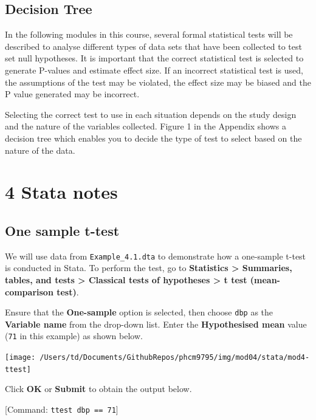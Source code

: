 \documentclass[
]{memoir}
\begin{document}
\hypertarget{decision-tree}{%
\section{Decision Tree}\label{decision-tree}}

In the following modules in this course, several formal statistical tests will be described to analyse different types of data sets that have been collected to test set null hypotheses. It is important that the correct statistical test is selected to generate P-values and estimate effect size. If an incorrect statistical test is used, the assumptions of the test may be violated, the effect size may be biased and the P value generated may be incorrect.

Selecting the correct test to use in each situation depends on the study design and the nature of the variables collected. Figure 1 in the Appendix shows a decision tree which enables you to decide the type of test to select based on the nature of the data.

\hypertarget{stata-notes}{%
\chapter*{\texorpdfstring{\textbf{4} Stata notes}{4 Stata notes}}\label{stata-notes}}

\hypertarget{one-sample-t-test-1}{%
\section{One sample t-test}\label{one-sample-t-test-1}}

We will use data from \texttt{Example\_4.1.dta} to demonstrate how a one-sample t-test is conducted in Stata. To perform the test, go to \textbf{Statistics \textgreater{} Summaries, tables, and tests \textgreater{} Classical tests of hypotheses \textgreater{} t test (mean-comparison test)}.

Ensure that the \textbf{One-sample} option is selected, then choose \texttt{dbp} as the \textbf{Variable name} from the drop-down list. Enter the \textbf{Hypothesised mean} value (\texttt{71} in this example) as shown below.

\texttt{[image: /Users/td/Documents/GithubRepos/phcm9795/img/mod04/stata/mod4-ttest]}

Click \textbf{OK} or \textbf{Submit} to obtain the output below.

{[}Command: \texttt{ttest\ dbp\ ==\ 71}{]}
\end{document}
